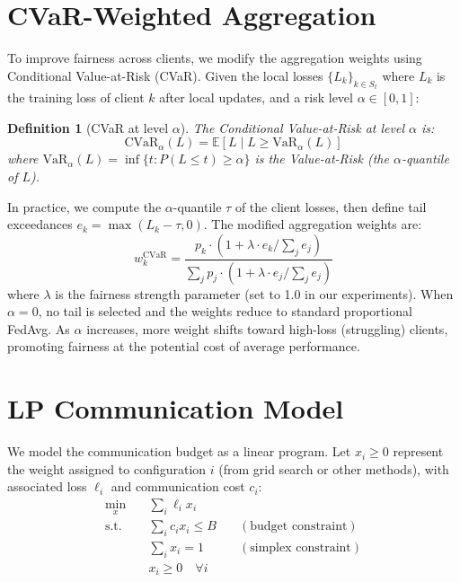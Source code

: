 \documentclass[11pt,a4paper]{report}
\newtheorem{definition}{Definition}[chapter]
\begin{document}
\section{CVaR-Weighted Aggregation}

To improve fairness across clients, we modify the aggregation weights using Conditional Value-at-Risk (CVaR). Given the local losses $\{L_k\}_{k \in S_t}$ where $L_k$ is the training loss of client $k$ after local updates, and a risk level $\alpha \in [0, 1]$:

\begin{definition}[CVaR at level $\alpha$]
The Conditional Value-at-Risk at level $\alpha$ is:
\begin{equation}
\text{CVaR}_\alpha(L) = \mathbb{E}[L \mid L \geq \text{VaR}_\alpha(L)]
\end{equation}
where $\text{VaR}_\alpha(L) = \inf\{t : P(L \leq t) \geq \alpha\}$ is the Value-at-Risk (the $\alpha$-quantile of $L$).
\end{definition}

In practice, we compute the $\alpha$-quantile $\tau$ of the client losses, then define tail exceedances $e_k = \max(L_k - \tau, 0)$. The modified aggregation weights are:
\begin{equation}
w_k^{\text{CVaR}} = \frac{p_k \cdot (1 + \lambda \cdot e_k / \sum_j e_j)}{\sum_j p_j \cdot (1 + \lambda \cdot e_j / \sum_j e_j)}
\label{eq:cvar_weights}
\end{equation}
where $\lambda$ is the fairness strength parameter (set to 1.0 in our experiments). When $\alpha = 0$, no tail is selected and the weights reduce to standard proportional FedAvg. As $\alpha$ increases, more weight shifts toward high-loss (struggling) clients, promoting fairness at the potential cost of average performance.

\section{LP Communication Model}

We model the communication budget as a linear program. Let $x_i \geq 0$ represent the weight assigned to configuration $i$ (from grid search or other methods), with associated loss $\ell_i$ and communication cost $c_i$:
\begin{equation}
\begin{aligned}
\min_{x} \quad & \sum_i \ell_i x_i \\
\text{s.t.} \quad & \sum_i c_i x_i \leq B \quad & (\text{budget constraint}) \\
& \sum_i x_i = 1 \quad & (\text{simplex constraint}) \\
& x_i \geq 0 \quad \forall i
\end{aligned}
\label{eq:lp}
\end{equation}
\end{document}
